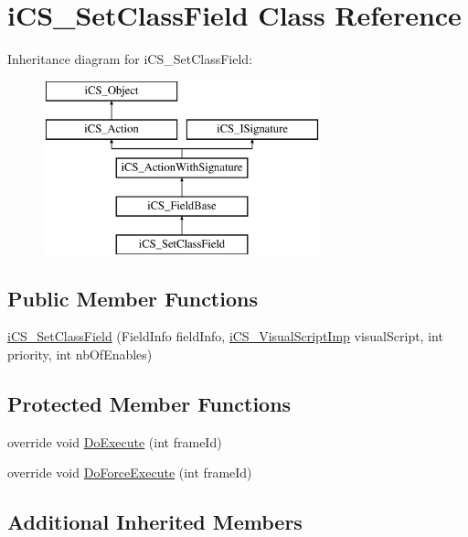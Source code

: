 \hypertarget{classi_c_s___set_class_field}{\section{i\+C\+S\+\_\+\+Set\+Class\+Field Class Reference}
\label{classi_c_s___set_class_field}
}
Inheritance diagram for i\+C\+S\+\_\+\+Set\+Class\+Field\+:\begin{figure}[H]
\begin{center}
\leavevmode
\includegraphics[height=5.000000cm]{classi_c_s___set_class_field}
\end{center}
\end{figure}
\subsection*{Public Member Functions}
\begin{DoxyCompactItemize}
\item 
\hyperlink{classi_c_s___set_class_field_ab63c7cd0ce80388f5ff1b70857cb3ee5}{i\+C\+S\+\_\+\+Set\+Class\+Field} (Field\+Info field\+Info, \hyperlink{classi_c_s___visual_script_imp}{i\+C\+S\+\_\+\+Visual\+Script\+Imp} visual\+Script, int priority, int nb\+Of\+Enables)
\end{DoxyCompactItemize}
\subsection*{Protected Member Functions}
\begin{DoxyCompactItemize}
\item 
override void \hyperlink{classi_c_s___set_class_field_ae39d1e8f31b1275ef188bd6ec34d325f}{Do\+Execute} (int frame\+Id)
\item 
override void \hyperlink{classi_c_s___set_class_field_a0b13593e4fe41850cb7fb283710213bb}{Do\+Force\+Execute} (int frame\+Id)
\end{DoxyCompactItemize}
\subsection*{Additional Inherited Members}


